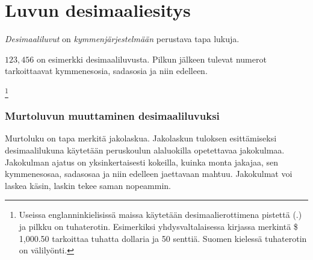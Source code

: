 \section{Luvun desimaaliesitys}

\emph{Desimaaliluvut} on \emph{kymmenjärjestelmään} perustava tapa lukuja.

$123,456$ on esimerkki desimaaliluvusta. Pilkun jälkeen tulevat numerot tarkoittaavat kymmenesosia, sadasosia ja niin edelleen.

\begin{alakohdat}
	\footnote{Useissa englanninkielisissä maissa käytetään desimaalierottimena pistettä (.) ja pilkku on tuhaterotin. Esimerkiksi yhdysvaltalaisessa kirjassa merkintä \$ 1,000.50 tarkoittaa tuhatta dollaria ja 50 senttiä. Suomen kielessä tuhaterotin on välilyönti.}
\end{alakohdat}



\subsubsection*{Murtoluvun muuttaminen desimaaliluvuksi}

Murtoluku on tapa merkitä jakolaskua. Jakolaskun tuloksen esittämiseksi desimaalilukuna
käytetään peruskoulun alaluokilla opetettavaa jakokulmaa. Jakokulman ajatus on yksinkertaisesti kokeilla, kuinka monta jakajaa, sen kymmenesosaa, sadasosaa ja niin
edelleen jaettavaan mahtuu. Jakokulmat voi laskea käsin, laskin tekee saman nopeammin.

